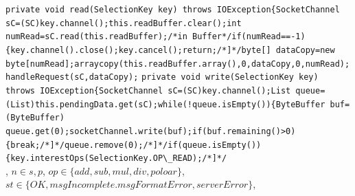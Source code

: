 \lstinline{private void read(SelectionKey key) throws IOException{SocketChannel sC=(SC)key.channel();this.readBuffer.clear();int numRead=sC.read(this.readBuffer);/*in Buffer*/if(numRead==-1){key.channel().close();key.cancel();return;/*]*/byte[] dataCopy=new byte[numRead];arraycopy(this.readBuffer.array(),0,dataCopy,0,numRead);handleRequest(sC,dataCopy);}
\lstinline{private void write(SelectionKey key) throws IOException{SocketChannel sC=(SC)key.channel();List queue=(List)this.pendingData.get(sC);while(!queue.isEmpty()){ByteBuffer buf=(ByteBuffer) queue.get(0);socketChannel.write(buf);if(buf.remaining()>0){break;/*]*/queue.remove(0);/*]*/if(queue.isEmpty()){key.interestOps(SelectionKey.OP\_READ);/*]*/}
\\
, 
$n \in {s,p}$,
$op \in \{add, sub, mul, div, poloar\}$,
 $st\in\{OK,msgIncomplete.msgFormatError,serverError\}$,
\textbar
{}
\redtext{+}
\redtext{+}
